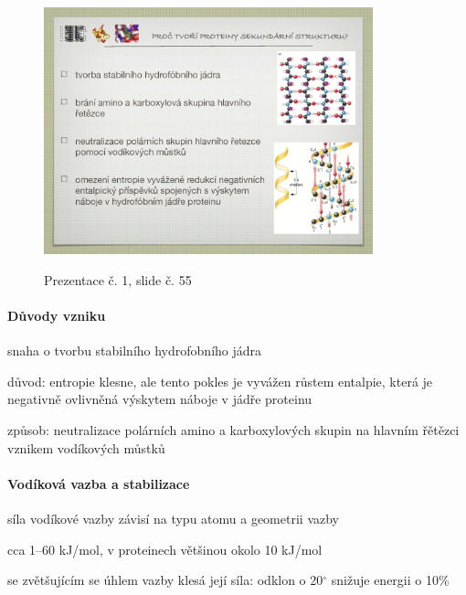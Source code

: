 \documentclass[DIV=8]{scrreprt}
\begin{document}
\begin{figure}
    \caption{Prezentace č. 1, slide č. 55}
    \includegraphics[width=0.85\textwidth]{slides-1/slide-55.jpg}
    \centering
    \label{slides-1-slide-55}
\end{figure}

\paragraph{Důvody vzniku}
\begin{myItemize}[nosep]
    \item snaha o tvorbu stabilního hydrofobního jádra
\begin{myItemize}[nosep]
    \item důvod: entropie klesne, ale tento pokles je vyvážen růstem entalpie, která je negativně ovlivněná výskytem náboje v jádře proteinu
    \item způsob: neutralizace polárních amino a karboxylových skupin na hlavním řětězci vznikem vodíkových můstků
\end{myItemize}

\end{myItemize}



\paragraph{Vodíková vazba a stabilizace}
\begin{myItemize}[nosep]
    \item síla vodíkové vazby závisí na typu atomu a geometrii vazby
\begin{myItemize}[nosep]
    \item cca 1--60 kJ/mol, v proteinech většinou okolo 10 kJ/mol
    \item se zvětšujícím se úhlem vazby klesá její síla: odklon o 20\(^{\circ}\) snižuje energii o 10\%
\end{myItemize}

\end{myItemize}
\end{document}
